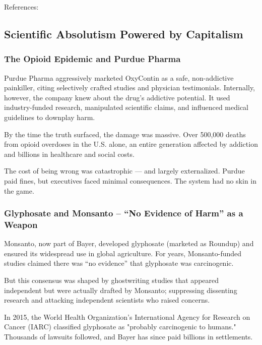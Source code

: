References: \cite{TobinMartin2022}


\subsection{Scientific Absolutism Powered by Capitalism}

\subsubsection{The Opioid Epidemic and Purdue Pharma}

Purdue Pharma aggressively marketed OxyContin as a safe, non-addictive painkiller, citing selectively crafted studies and physician testimonials. Internally, however, the company knew about the drug's addictive potential. It used industry-funded research, manipulated scientific claims, and influenced medical guidelines to downplay harm.

By the time the truth surfaced, the damage was massive. Over 500,000 deaths from opioid overdoses in the U.S. alone, an entire generation affected by addiction and billions in healthcare and social costs.

The cost of being wrong was catastrophic — and largely externalized. Purdue paid fines, but executives faced minimal consequences. The system had no skin in the game.

\cite{CBSnewsPurduePharma}
\cite{PBSPurduePharma}
\cite{Alonso2021}

\subsubsection{Glyphosate and Monsanto – “No Evidence of Harm” as a Weapon}

Monsanto, now part of Bayer, developed glyphosate (marketed as Roundup) and ensured its widespread use in global agriculture. For years, Monsanto-funded studies claimed there was “no evidence” that glyphosate was carcinogenic.

But this consensus was shaped by ghostwriting studies that appeared independent but were actually drafted by Monsanto; suppressing dissenting research and attacking independent scientists who raised concerns.

In 2015, the World Health Organization’s International Agency for Research on Cancer (IARC) classified glyphosate as "probably carcinogenic to humans." Thousands of lawsuits followed, and Bayer has since  paid billions in settlements.

